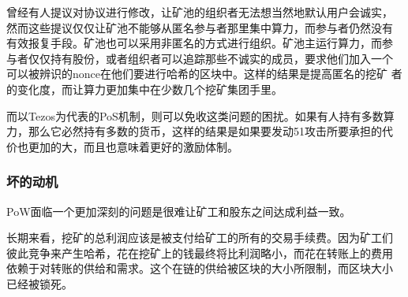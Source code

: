 \documentclass[letterpaper]{article}
\begin{document}
曾经有人提议对协议进行修改，让矿池的组织者无法想当然地默认用户会诚实，
然而这些提议仅仅让矿池不能够从匿名参与者那里集中算力，而参与者仍然没有
有效报复手段。矿池也可以采用非匿名的方式进行组织。矿池主运行算力，而参
与者仅仅持有股份，或者组织者可以追踪那些不诚实的成员，要求他们加入一个
可以被辨识的nonce在他们要进行哈希的区块中。这样的结果是提高匿名的挖矿
者的变化度，而让算力更加集中在少数几个挖矿集团手里。

而以Tezos为代表的PoS机制，则可以免收这类问题的困扰。如果有人持有多数算
力，那么它必然持有多数的货币，这样的结果是如果要发动51攻击所要承担的代
价也更加的大，而且也意味着更好的激励体制。

\subsubsection{坏的动机}
PoW面临一个更加深刻的问题是很难让矿工和股东之间达成利益一致。

长期来看，挖矿的总利润应该是被支付给矿工的所有的交易手续费。因为矿工们
彼此竞争来产生哈希，花在挖矿上的钱最终将比利润略小，而花在转账上的费用
依赖于对转账的供给和需求。这个在链的供给被区块的大小所限制，而区块大小
已经被锁死。
\end{document}
